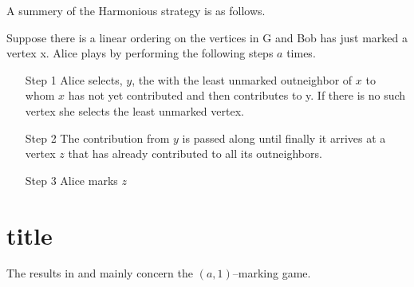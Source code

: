 \documentclass[11pt]{article}
\numberwithin{figure}{section}
\theoremstyle{definition}
\begin{document}
    A summery of the Harmonious strategy is as follows.
    
    Suppose there is a linear ordering on the vertices in G and Bob has just marked a vertex x. Alice plays by performing the following steps $a$ times.    
    \begin{itemize}
        \item [Step 1] Alice selects, $y$, the with the least unmarked outneighbor of $x$ to whom $x$ has not yet contributed and then contributes to y. If there is no such vertex she selects the least unmarked vertex.
        \item [Step 2] The contribution from $y$
         is passed along until finally it arrives at a vertex $z$ that has already
        contributed to all its outneighbors.
        \item [Step 3] Alice marks $z$
    \end{itemize}
    
    \section{title}
    The results in \cite{kierYang2005} and \cite{yangZhu2008} mainly concern the $(a,1)$--marking game.
    
    
    
\end{document}
